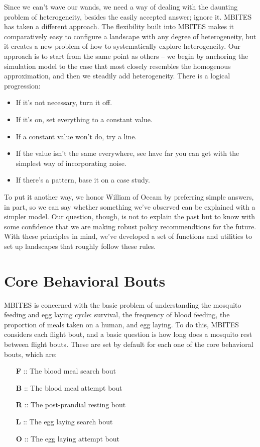 \documentclass{article}
\begin{document}
Since we can't wave our wands, we need a way of dealing with the daunting problem of heterogeneity, besides the easily accepted answer; ignore it. MBITES has taken a different approach. The flexibility built into MBITES makes it comparatively easy to configure a landscape with any degree of heterogeneity, but it creates a new problem of how to systematically explore heterogeneity.  Our approach is to start from the same point as others -- we begin by anchoring the simulation model to the case that most closely resembles the homogenous approximation, and then we steadily add heterogeneity. There is a logical progression: 
\begin{itemize}
\item If it's not necessary, turn it off. 
\item If it's on, set everything to a constant value. 
\item If a constant value won't do, try a line. 
\item If the value isn't the same everywhere, see have far you can get with the simplest way of incorporating noise.
\item If there's a pattern, base it on a case study.  
\end{itemize}
To put it another way, we honor William of Occam by preferring simple answers, in part, so we can say whether something we've observed can be explained with a simpler model. Our question, though, is not to explain the past but to know with some confidence that we are making robust policy recommendtions for the future. With these principles in mind, we've developed a set of functions and utilities to set up landscapes that roughly follow these rules. 

\clearpage 

\section{Core Behavioral Bouts}

MBITES is concerned with the basic problem of understanding the mosquito feeding and egg laying cycle: survival, the frequency of blood feeding, the proportion of meals taken on a human, and egg laying. To do this, MBITES considers each flight bout, and a basic question is how long does a mosquito rest between flight bouts. These are set by default for each one of the core behavioral bouts, which are:
\begin{itemize}
\item [{\bf F} ::] The blood meal search bout
\item [{\bf B} ::] The blood meal attempt bout
\item [{\bf R} ::] The post-prandial resting bout
\item [{\bf L} ::] The egg laying search bout
\item [{\bf O} ::] The egg laying attempt bout
\end{itemize}
\end{document}
